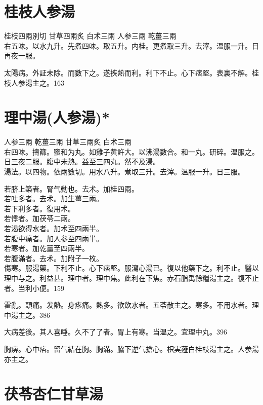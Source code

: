 \section{桂枝人参湯}

桂枝{\scriptsize 四兩別切} 甘草{\scriptsize 四兩炙} 白术{\scriptsize 三兩} 人参{\scriptsize 三兩} 乾薑{\scriptsize 三兩}\\
右五味。以水九升。先煮四味。取五升。内桂。更煮取三升。去滓。温服一升。日再夜一服。

太陽病。外証未除。而數下之。遂挾熱而利。利下不止。心下痞堅。表裏不解。桂枝人参湯主之。163

\section{理中湯(人参湯)*}

人参{\scriptsize 三兩} 乾薑{\scriptsize 三兩} 甘草{\scriptsize 三兩炙} 白术{\scriptsize 三兩}\\
右四味。擣篩。蜜和为丸。如雞子黄許大。以沸湯數合。和一丸。研碎。温服之。日三夜二服。腹中未熱。益至三四丸。然不及湯。\\
湯法。以四物。依兩數切。用水八升。煮取三升。去滓。温服一升。日三服。

{\khaaitp 若}脐上築者。腎气動也。去术。加桂四兩。\\
{\khaaitp 若}吐多者。去术。加生薑三兩。\\
{\khaaitp 若}下{\khaaitp 利}多者。復用术。\\
{\khaaitp 若}悸者。加茯苓二兩。\\
{\khaaitp 若}渴{\khaaitp 欲得水}者。加术至四兩半。\\
{\khaaitp 若}腹中痛者。加人参至四兩半。\\
{\khaaitp 若}寒者。加乾薑至四兩半。\\
{\khaaitp 若}腹滿者。去术。加附子一枚。\\

傷寒。服湯藥。下利不止。心下痞堅。服瀉心湯已。復以他藥下之。利不止。醫以理中与之。利益甚。理中者。理中焦。此利在下焦。赤石脂禹餘糧湯主之。復不止者。当利小便。159

霍亂。頭痛。发熱。身疼痛。熱多。欲飲水者。五苓散主之。寒多。不用水者。理中湯主之。386

大病差後。其人喜唾。久不了了者。胃上有寒。当温之。宜理中丸。396

胸痹。心中痞。留气結在胸。胸滿。脇下逆{\khaaitp 气}搶心。枳実薤白桂枝湯主之。人参湯亦主之。

\section{茯苓杏仁甘草湯}

